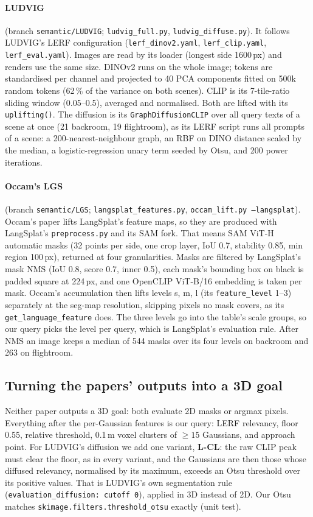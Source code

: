 \documentclass[11pt,a4paper]{article}
\newcommand{\code}[1]{\texttt{\small #1}}
\begin{document}
\paragraph{LUDVIG} (branch \code{semantic/LUDVIG}; \code{ludvig\_full.py}, \code{ludvig\_diffuse.py}). It follows
LUDVIG's LERF configuration (\code{lerf\_dinov2.yaml}, \code{lerf\_clip.yaml}, \code{lerf\_eval.yaml}). Images are read by
its loader (longest side 1600\,px) and renders use the same size. DINOv2 runs on the whole image; tokens are
standardised per channel and projected to 40 PCA components fitted on 500k random tokens (62\,\% of the variance on both
scenes). CLIP is its 7-tile-ratio sliding window (0.05--0.5), averaged and normalised. Both are lifted with its
\code{uplifting()}. The diffusion is its \code{GraphDiffusionCLIP} over all query texts of a scene at once (21 backroom,
19 flightroom), as its LERF script runs all prompts of a scene: a 200-nearest-neighbour graph, an RBF on DINO distance
scaled by the median, a logistic-regression unary term seeded by Otsu, and 200 power iterations.

\paragraph{Occam's LGS} (branch \code{semantic/LGS}; \code{langsplat\_features.py}, \code{occam\_lift.py --langsplat}).
Occam's paper lifts LangSplat's feature maps, so they are produced with LangSplat's \code{preprocess.py} and its SAM fork.
That means SAM ViT-H automatic masks (32 points per side, one crop layer, IoU 0.7, stability 0.85, min region 100\,px),
returned at four granularities. Masks are filtered by LangSplat's mask NMS (IoU 0.8, score 0.7, inner 0.5), each mask's
bounding box on black is padded square at 224\,px, and one OpenCLIP ViT-B/16 embedding is taken per mask. Occam's
accumulation then lifts levels s, m, l (its \code{feature\_level} 1--3) separately at the seg-map resolution, skipping
pixels no mask covers, as its \code{get\_language\_feature} does. The three levels go into the table's scale groups, so our
query picks the level per query, which is LangSplat's evaluation rule. After NMS an image keeps a median of 544 masks over
its four levels on backroom and 263 on flightroom.

\subsection{Turning the papers' outputs into a 3D goal}
Neither paper outputs a 3D goal: both evaluate 2D masks or argmax pixels. Everything after the per-Gaussian features is
our query: LERF relevancy, floor 0.55, relative threshold, 0.1\,m voxel clusters of $\geq15$ Gaussians, and approach
point. For LUDVIG's diffusion we add one variant, \textbf{L-CL}: the raw CLIP peak must clear the floor, as in every
variant, and the Gaussians are then those whose diffused relevancy, normalised by its maximum, exceeds an Otsu
threshold over its positive values. That is LUDVIG's own segmentation rule (\code{evaluation\_diffusion: cutoff 0}),
applied in 3D instead of 2D. Our Otsu matches \code{skimage.filters.threshold\_otsu} exactly (unit test).
\end{document}
